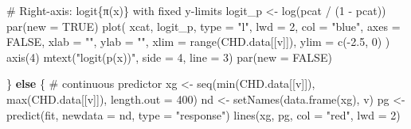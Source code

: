 \documentclass[
  letterpaper,
  DIV=11,
  numbers=noendperiod]{scrreprt}
\newenvironment{Shaded}{\begin{snugshade}}{\end{snugshade}}
\newcommand{\AttributeTok}[1]{\textcolor[rgb]{0.40,0.45,0.13}{#1}}
\newcommand{\CommentTok}[1]{\textcolor[rgb]{0.37,0.37,0.37}{#1}}
\newcommand{\ConstantTok}[1]{\textcolor[rgb]{0.56,0.35,0.01}{#1}}
\newcommand{\ControlFlowTok}[1]{\textcolor[rgb]{0.00,0.23,0.31}{\textbf{#1}}}
\newcommand{\DecValTok}[1]{\textcolor[rgb]{0.68,0.00,0.00}{#1}}
\newcommand{\FloatTok}[1]{\textcolor[rgb]{0.68,0.00,0.00}{#1}}
\newcommand{\FunctionTok}[1]{\textcolor[rgb]{0.28,0.35,0.67}{#1}}
\newcommand{\NormalTok}[1]{\textcolor[rgb]{0.00,0.23,0.31}{#1}}
\newcommand{\OtherTok}[1]{\textcolor[rgb]{0.00,0.23,0.31}{#1}}
\newcommand{\SpecialCharTok}[1]{\textcolor[rgb]{0.37,0.37,0.37}{#1}}
\newcommand{\StringTok}[1]{\textcolor[rgb]{0.13,0.47,0.30}{#1}}
\begin{document}
\begin{Shaded}
\begin{Highlighting}[]
    \CommentTok{\# Right{-}axis: logit\{π(x)\} with fixed y{-}limits}
\NormalTok{    logit\_p }\OtherTok{\textless{}{-}} \FunctionTok{log}\NormalTok{(pcat }\SpecialCharTok{/}\NormalTok{ (}\DecValTok{1} \SpecialCharTok{{-}}\NormalTok{ pcat))}
    \FunctionTok{par}\NormalTok{(}\AttributeTok{new =} \ConstantTok{TRUE}\NormalTok{)}
    \FunctionTok{plot}\NormalTok{(}
\NormalTok{      xcat, logit\_p, }\AttributeTok{type =} \StringTok{"l"}\NormalTok{, }\AttributeTok{lwd =} \DecValTok{2}\NormalTok{, }\AttributeTok{col =} \StringTok{"blue"}\NormalTok{,}
      \AttributeTok{axes =} \ConstantTok{FALSE}\NormalTok{, }\AttributeTok{xlab =} \StringTok{""}\NormalTok{, }\AttributeTok{ylab =} \StringTok{""}\NormalTok{,}
      \AttributeTok{xlim =} \FunctionTok{range}\NormalTok{(CHD.data[[v]]), }\AttributeTok{ylim =} \FunctionTok{c}\NormalTok{(}\SpecialCharTok{{-}}\FloatTok{2.5}\NormalTok{, }\DecValTok{0}\NormalTok{)}
\NormalTok{    )}
    \FunctionTok{axis}\NormalTok{(}\DecValTok{4}\NormalTok{)}
    \FunctionTok{mtext}\NormalTok{(}\StringTok{"logit(p(x))"}\NormalTok{, }\AttributeTok{side =} \DecValTok{4}\NormalTok{, }\AttributeTok{line =} \DecValTok{3}\NormalTok{)}
    \FunctionTok{par}\NormalTok{(}\AttributeTok{new =} \ConstantTok{FALSE}\NormalTok{)}

\NormalTok{  \} }\ControlFlowTok{else}\NormalTok{ \{}
    \CommentTok{\# continuous predictor}
\NormalTok{    xg }\OtherTok{\textless{}{-}} \FunctionTok{seq}\NormalTok{(}\FunctionTok{min}\NormalTok{(CHD.data[[v]]), }\FunctionTok{max}\NormalTok{(CHD.data[[v]]), }\AttributeTok{length.out =} \DecValTok{400}\NormalTok{)}
\NormalTok{    nd }\OtherTok{\textless{}{-}} \FunctionTok{setNames}\NormalTok{(}\FunctionTok{data.frame}\NormalTok{(xg), v)}
\NormalTok{    pg }\OtherTok{\textless{}{-}} \FunctionTok{predict}\NormalTok{(fit, }\AttributeTok{newdata =}\NormalTok{ nd, }\AttributeTok{type =} \StringTok{"response"}\NormalTok{)}
    \FunctionTok{lines}\NormalTok{(xg, pg, }\AttributeTok{col =} \StringTok{"red"}\NormalTok{, }\AttributeTok{lwd =} \DecValTok{2}\NormalTok{)}


\end{Highlighting}
\end{Shaded}
\end{document}
